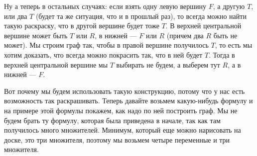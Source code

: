 \documentclass[russian]{lecture-notes}
\theoremstyle{definition}
\begin{document}
		\begin{figure} [H]
			\centering
		\end{figure}
		
		Ну а теперь в остальных случаях: если взять одну левую вершину $ F $, а другую $ T $, или два $ T $ (будет та же ситуация, что и в прошлый раз), то всегда можно найти такую раскраску, что в другой вершине будет тоже $ T $. В верхней центральной вершине может быть $ T $ или $ R $, в нижней --- $ F $ или $ R $ (причем два $R$ быть не может).
		Мы строим граф так, чтобы в правой вершине получилось $T$, то есть мы хотим доказать, что всегда можно покрасить так, что в ней будет $ T $. Тогда в верхней центральной вершине мы $T$ выбирать не будем, а выберем тут $ R $, а в нижней --- $F$.
		
		\begin{figure} [H]
			\centering
		\end{figure}
		
		Вот почему мы будем использовать такую конструкцию, потому что у нас есть возможность так раскрашивать. Теперь давайте возьмем какую-нибудь формулу и на примере этой формулы покажем, как надо по ней построить граф.
		Мы не будем брать ту формулу, которая была приведена в начале, так как там получилось много множителей. Минимум, который еще можно нарисовать на доске, это три множителя, поэтому мы возьмем четыре переменные и три множителя.
		
\end{document}
